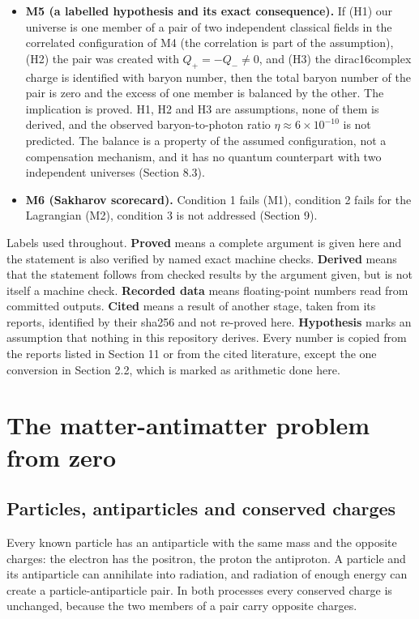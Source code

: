 \documentclass[11pt]{article}
\begin{document}
\begin{itemize}
\item \textbf{M5 (a labelled hypothesis and its exact consequence).} If (H1) our universe is one member of a pair of two independent classical fields in the correlated configuration of M4 (the correlation is part of the assumption), (H2) the pair was created with $Q_+=-Q_-\ne0$, and (H3) the dirac16complex charge is identified with baryon number, then the total baryon number of the pair is zero and the excess of one member is balanced by the other. The implication is proved. H1, H2 and H3 are assumptions, none of them is derived, and the observed baryon-to-photon ratio $\eta\approx6\times10^{-10}$ is not predicted. The balance is a property of the assumed configuration, not a compensation mechanism, and it has no quantum counterpart with two independent universes (Section 8.3).
\item \textbf{M6 (Sakharov scorecard).} Condition 1 fails (M1), condition 2 fails for the Lagrangian (M2), condition 3 is not addressed (Section 9).
\end{itemize}

Labels used throughout. \textbf{Proved} means a complete argument is given here and the statement is also verified by named exact machine checks. \textbf{Derived} means that the statement follows from checked results by the argument given, but is not itself a machine check. \textbf{Recorded data} means floating-point numbers read from committed outputs. \textbf{Cited} means a result of another stage, taken from its reports, identified by their sha256 and not re-proved here. \textbf{Hypothesis} marks an assumption that nothing in this repository derives. Every number is copied from the reports listed in Section 11 or from the cited literature, except the one conversion in Section 2.2, which is marked as arithmetic done here.

\section{The matter-antimatter problem from zero}

\subsection{Particles, antiparticles and conserved charges}

Every known particle has an antiparticle with the same mass and the opposite charges: the electron has the positron, the proton the antiproton. A particle and its antiparticle can annihilate into radiation, and radiation of enough energy can create a particle-antiparticle pair. In both processes every conserved charge is unchanged, because the two members of a pair carry opposite charges.
\end{document}
